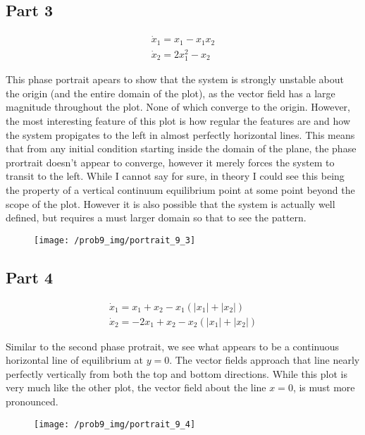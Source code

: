 \subsection*{Part 3}

$$
\begin{array}{l}
\dot{x}_{1}=x_{1}-x_{1} x_{2} \\
\dot{x}_{2}=2 x_{1}^{2}-x_{2}
\end{array}
$$

\noindent This phase portrait apears to show that the system is strongly unstable about the origin (and the entire domain of the plot), as the vector field has a large magnitude throughout the plot. None of which converge to the origin. However, the most interesting feature of this plot is how regular the features are and how the system propigates to the left in almost perfectly horizontal lines. This means that from any initial condition starting inside the domain of the plane, the phase prortrait doesn't appear to converge, however it merely forces the system to transit to the left. While I cannot say for sure, in theory I could see this being the property of a vertical continuum equilibrium point at some point beyond the scope of the plot. However it is also possible that the system is actually well defined, but requires a must larger domain so that to see the pattern.

\begin{figure}[h]
  \centering

  \texttt{[image: /prob9\_img/portrait\_9\_3]}
\end{figure}


\subsection*{Part 4}

$$
\begin{array}{l}
\dot{x}_{1}=x_{1}+x_{2}-x_{1}\left(\left|x_{1}\right|+\left|x_{2}\right|\right) \\
\dot{x}_{2}=-2 x_{1}+x_{2}-x_{2}\left(\left|x_{1}\right|+\left|x_{2}\right|\right)
\end{array}
$$

\noindent Similar to the second phase protrait, we see what appears to be a continuous horizontal line of equilibrium at $y=0$. The vector fields approach that line nearly perfectly vertically from both the top and bottom directions. While this plot is very much like the other plot, the vector field about the line $x = 0$, is must more pronounced.

\begin{figure}[h]
  \centering
  \texttt{[image: /prob9\_img/portrait\_9\_4]}
\end{figure}
